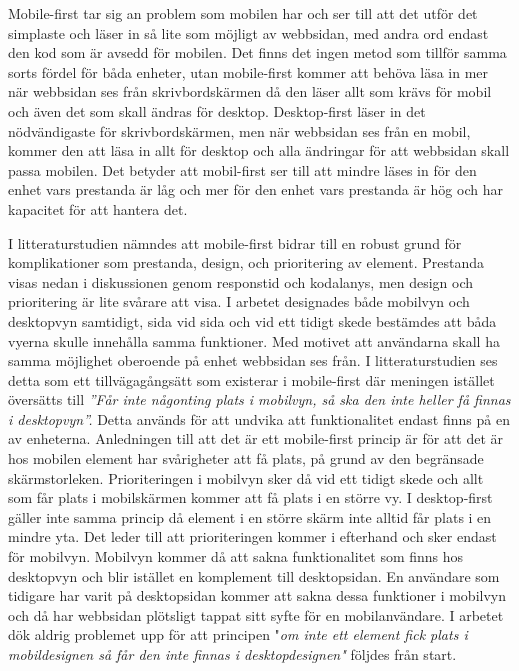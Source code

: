 \documentclass[11pt]{article}
\begin{document}
Mobile-first tar sig an problem som mobilen har och ser till att det utför det simplaste och läser in så lite som möjligt av webbsidan, med andra ord endast den kod som är avsedd för mobilen. Det finns det ingen metod som tillför samma sorts fördel för båda enheter, utan mobile-first kommer att behöva läsa in mer när webbsidan ses från skrivbordskärmen då den läser allt som krävs för mobil och även det som skall ändras för desktop. Desktop-first läser in det nödvändigaste för skrivbordskärmen, men när webbsidan ses från en mobil, kommer den att läsa in allt för desktop och alla ändringar för att webbsidan skall passa mobilen. Det betyder att mobil-first ser till att mindre läses in för den enhet vars prestanda är låg och mer för den enhet vars prestanda är hög och har kapacitet för att hantera det.

I litteraturstudien nämndes att mobile-first bidrar till en robust grund för komplikationer som prestanda, design, och prioritering av element. Prestanda visas nedan i diskussionen genom responstid och kodalanys, men design och prioritering är lite svårare att visa. I arbetet designades både mobilvyn och desktopvyn samtidigt, sida vid sida och vid ett tidigt skede bestämdes att båda vyerna skulle innehålla samma funktioner. Med motivet att användarna skall ha samma möjlighet oberoende på enhet webbsidan ses från. I litteraturstudien ses detta som ett tillvägagångsätt som existerar i mobile-first där meningen istället översätts till \textit{”Får inte någonting plats i mobilvyn, så ska den inte heller få finnas i desktopvyn”.} Detta används för att undvika att funktionalitet endast finns på en av enheterna. Anledningen till att det är ett mobile-first princip är för att det är hos mobilen element har svårigheter att få plats, på grund av den begränsade skärmstorleken. Prioriteringen i mobilvyn sker då vid ett tidigt skede och allt som får plats i mobilskärmen kommer att få plats i en större vy. I desktop-first gäller inte samma princip då element i en större skärm inte alltid får plats i en mindre yta. Det leder till att prioriteringen kommer i efterhand och sker endast för mobilvyn. Mobilvyn kommer då att sakna funktionalitet som finns hos desktopvyn och blir istället en komplement till desktopsidan. En användare som tidigare har varit på desktopsidan kommer att sakna dessa funktioner i mobilvyn och då har webbsidan plötsligt tappat sitt syfte för en mobilanvändare. I arbetet dök aldrig problemet upp för att principen "\textit{om inte ett element fick plats i mobildesignen så får den inte finnas i desktopdesignen"} följdes från start.
\end{document}
